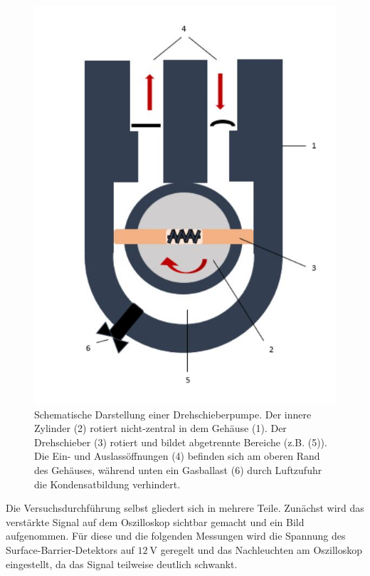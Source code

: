 \begin{figure}
  \centering
  \includegraphics[height=0.35\textheight]{images/pumpe.jpg}
  \caption{Schematische Darstellung einer Drehschieberpumpe. Der innere Zylinder (2) rotiert nicht-zentral in dem Gehäuse (1). Der Drehschieber (3) rotiert und bildet abgetrennte Bereiche (z.B. (5)). Die Ein- und Auslassöffnungen (4) befinden sich am oberen Rand des Gehäuses, während unten ein Gasballast (6) durch Luftzufuhr die Kondensatbildung verhindert. \cite{pumpe}}
  \label{fig:pumpe}
\end{figure}

Die Versuchsdurchführung selbst gliedert sich in mehrere Teile.
Zunächst wird das verstärkte Signal auf dem Oszilloskop sichtbar gemacht und ein Bild aufgenommen. Für diese und die folgenden Messungen wird die Spannung des Surface-Barrier-Detektors auf $\SI{12}{\volt}$ geregelt und das Nachleuchten am Oszilloskop eingestellt, da das Signal teilweise deutlich schwankt.

